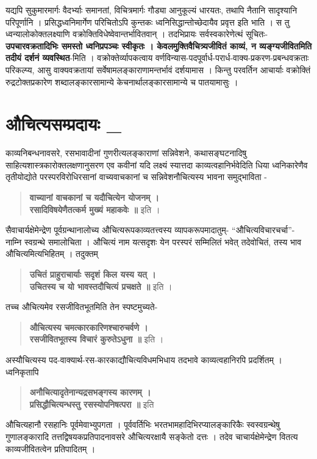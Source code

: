 {यद्यपि सुकुमारमार्गः वैदर्भ्याः समानतां, विचित्रमार्गः गौड्या आनुकूल्यं धारयतः, तथापि नैतानि सादृश्यानि परिपूर्णानि । प्रसिद्धध्वनिमार्गेण परिचितोऽपि कुन्तकः ध्वनिसिद्धान्तोच्छेदायैव प्रवृत्त इति भाति । स तु ध्वन्यालोकोक्तलक्ष्याणि वक्रोक्तिविधेष्वेवान्तर्भावितवान् । तदभिप्रायः सर्वस्वकारेणेत्थं सूचितः- \textbf{उपचारवक्रतादिभिः समस्तो ध्वनिप्रपञ्चः स्वीकृतः । केवलमुक्तिवैचित्र्यजीवितं काव्यं, न व्यङ्ग्यजीवितमिति तदीयं दर्शनं व्यवस्थित}-मिति । वक्रोक्तेर्व्यापकत्वाय वर्णविन्यास-पदपूर्वार्ध-परार्ध-वाक्य-प्रकरण-प्रबन्धवक्रताः परिकल्प्य, आसु वाक्यवक्रतायां सर्वेषामलङ्काराणामन्तर्भावं दर्शयामास । किन्तु परवर्तिन आचार्याः वक्रोक्तिं रुद्रटोक्तप्रकारेण शब्दालङ्कारसामान्ये केचनार्थालङ्कारसामान्ये च पातयामासुः ।

\section*{ औचित्यसम्प्रदायः \_} 

काव्यनिबन्धनावसरे, रसभावादीनां गुणरीत्यलङ्काराणां सन्निवेशने, कथासङ्घटनादिषु साहित्यशास्त्रकारोक्तलक्षणानुसरण एव कवीनां यदि लक्ष्यं स्यात्तदा काव्यत्वहानिर्भवेदिति धिया ध्वनिकारेणैव तृतीयोद्योते परस्परविरोधिरसानां वाच्यवाचकानां च सन्निवेशनौचित्यस्य भावना समुद्भाविता - 
\begin{verse}
\textbf{वाच्यानां वाचकानां च यदौचित्येन योजनम् ।\\
रसादिविषयेणैतत्कर्म मुख्यं महाकवेः ॥} इति । 
\end{verse}

सैवाचार्यक्षेमेन्द्रेण पूर्वग्रन्थानालोच्य औचित्यरूपकाव्यतत्त्वस्य व्यापकरूपमादातुम्- “औचित्यविचारचर्चा”- नाम्नि स्वग्रन्थे समालोचिता । औचित्यं नाम यत्सदृशः येन परस्परं सम्मिलितं भवेत् तदेवोचितं, तस्य भाव औचित्यमित्यभिहितम् । तदुक्तम्

\begin{verse}
\textbf{उचितं प्राहुराचार्याः सदृशं किल यस्य यत् । \\
उचितस्य च यो भावस्तदौचित्यं प्रचक्षते ॥} इति ।
\end{verse} 
तच्च औचित्यमेव रसजीवितभूतमिति तेन स्पष्टमुच्यते-
\begin{verse}
\textbf{औचित्यस्य चमत्कारकारिणश्चारुचर्वणे ।\\
रसजीवितभूतस्य विचारं कुरुतेऽधुना ॥} इति । 
\end{verse}
अस्यौचित्यस्य पद-वाक्यार्थ-रस-कारकाद्यौचित्यविधमभिधाय तदभावे काव्यत्वहानिरपि प्रदर्शितम् । ध्वनिकृतापि
\begin{verse}
\textbf{अनौचित्यादृतेनान्यद्रसभङ्गस्य कारणम् ।\\
प्रसिद्धौचित्यन्धस्तु रसस्योपनिषत्परा ॥} इति 
\end{verse}
औचित्यहानौ रसहानिः पूर्वमेवाभ्युपगता । पूर्ववर्तिभिः भरतभामहादिभिरप्यालङ्कारिकैः स्वस्वग्रन्थेषु गुणालङ्कारादि तत्तद्विषयकप्रतिपादनावसरे औचित्यरक्षायै सङ्केतो दत्तः । तदेव चाचार्यक्षेमेन्द्रेण वितत्य काव्यजीवितत्वेन प्रतिपादितम् । 

}
